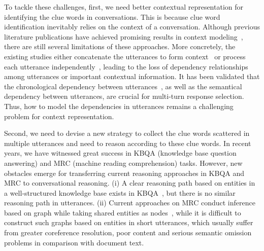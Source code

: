 \documentclass[letterpaper]{article}
\begin{document}
To tackle these challenges, first, we need better contextual representation for identifying the clue words in conversations. This is because clue word identification inevitably relies on the context of a conversation. Although previous literature publications have achieved promising results in context modeling~\cite{Tao2019,qu2019bert,su2019improving}, there are still several limitations of these approaches. More concretely, the existing studies either concatenate the utterances to form context~\cite{su2019improving} or process each utterance independently~\cite{Tao2020,Lu2020}, leading to the loss of dependency relationships among utterances or important contextual information. It has been validated that the chronological dependency between utterances~\cite{Lu2020,yeh2019flowdelta}, as well as the semantical dependency between utterances, are crucial for multi-turn response selection. Thus, how to model the dependencies in utterances remains a challenging problem for context representation.

Second, we need to devise a new strategy to collect the clue words scattered in multiple utterances and need to reason according to these clue words. In recent years, we have witnessed great success in KBQA (knowledge base question answering) and MRC (machine reading comprehension) tasks. However, new obstacles emerge for transferring current reasoning approaches in KBQA and MRC to conversational reasoning. (i) A clear reasoning path based on entities in a well-structured knowledge base exists in KBQA~\cite{2017Variational,xu2019enhancing}, but there is no similar reasoning path in utterances. (ii) Current approaches on MRC conduct inference based on graph while taking shared entities as nodes~\cite{Fang2019,Qiu2020,Martin}, while it is difficult to construct such graphs based on entities in short utterances, which usually suffer from greater coreference resolution, poor content and serious semantic omission problems in comparison with document text.
\end{document}
